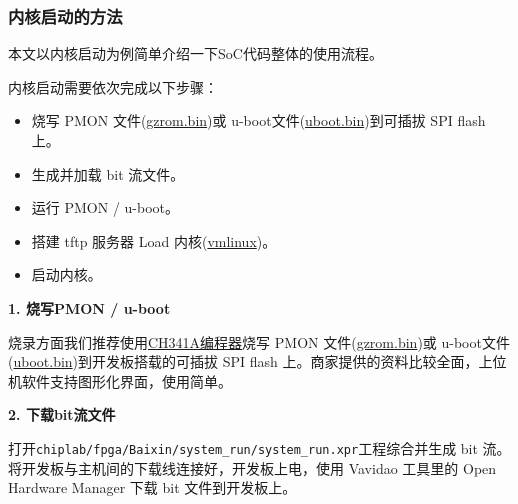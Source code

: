 \subsubsection{内核启动的方法}\label{sec:12-fpga-verification-004}

本文以内核启动为例简单介绍一下SoC代码整体的使用流程。

内核启动需要依次完成以下步骤：

\begin{itemize}
\tightlist
\item
  烧写 PMON 文件(\href{https://gitee.com/chenzes/chiplab-tools/releases/download/pmon/gzrom.bin}{gzrom.bin})或 u-boot文件(\href{https://gitee.com/llh730/la32r-uboot/releases}{uboot.bin})到可插拔 SPI flash 上。
\item
  生成并加载 bit 流文件。
\item
  运行 PMON / u-boot。
\item
  搭建 tftp 服务器 Load 内核(\href{https://gitee.com/loongson-edu/la32r-Linux/releases}{vmlinux})。
\item
  启动内核。
\end{itemize}

\textbf{1. 烧写PMON / u-boot}

烧录方面我们推荐使用\href{https://detail.tmall.com/item.htm?spm=a21n57.1.item.2.21e3523cc9elHp\&priceTId=2147bfb717231061625906771e52e0\&utparam=\%7B\%22aplus_abtest\%22\%3A\%22abee490f5aa02657b98af3e8efcc7a9b\%22\%7D\&id=807896685118\&ns=1\&abbucket=10\&xxc=taobaoSearch\&skuId=5659871783574\&pisk=fR8ttPGMuvDMFZnD5Cihow64wxGnEFdZIdR7otXgcpppG94m_NmVkKBp3OjG5O4AkIp2nKdq_s6XhKBDjD0k_C7VlY4xr4AwYwZe1dBbl9Gfa_rjW2mn1C7VlxF3l00J_LhWJmDAcXQCMsZ1lG_bR66FMsw6hOsQd_CPlt9flXQCgsXb5O_bOJ1jCDcF3vXuknOCXJ97-Sz0oeCI3TOTfrCHR1UCeCBKFV8LzGBW19UjE5hM5tBePvmpTLx6I6JxyvQW4pLAVZ3TU1KBww6GPVFNFFfvZnd-e-fefdLCDecqbBLABgT1vqhlRNCXhiKEezfOSHIJWhl4dC9lB3_wi7HM9gKd46sQMl_MqQYVVFgTU9jPMpIkXYU9Fgl6rUEjq8XRilGK9orVf6jlSZz6mdUr36BotGZ40MeO9TcK9orVf65dEX4_0oSLB}{CH341A编程器}烧写 PMON 文件(\href{https://gitee.com/chenzes/chiplab-tools/releases/download/pmon/gzrom.bin}{gzrom.bin})或 u-boot文件(\href{https://gitee.com/llh730/la32r-uboot/releases}{uboot.bin})到开发板搭载的可插拔 SPI flash 上。商家提供的资料比较全面，上位机软件支持图形化界面，使用简单。

\textbf{2. 下载bit流文件}

打开\texttt{chiplab/fpga/Baixin/system\_run/system\_run.xpr}工程综合并生成 bit 流。将开发板与主机间的下载线连接好，开发板上电，使用 Vavidao 工具里的 Open Hardware Manager 下载 bit 文件到开发板上。

